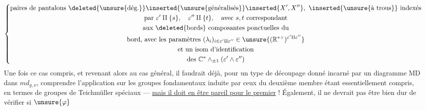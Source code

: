 \[
\left\{\begin{gathered}
\text{paires de pantalons }\deleted{\text{\unsure{dég.}}}\inserted{\text{\unsure{généralisés}}}\inserted{X',X''},\ \inserted{\text{\unsure{à trous}}}\ \text{indexés}\\
\text{par }\varepsilon'\amalg\{s\},\quad\varepsilon''\amalg\{t\},\quad\text{avec }s,t\ \text{correspondant}\\
\text{aux }\deleted{\text{bords}}\ \text{composantes ponctuelles du}\\
\text{bord, avec les paramètres }(\lambda_i)_{i\in\varepsilon'\amalg\varepsilon''}\in\unsure{(\mathbb R^{*+})^{\varepsilon'\amalg\varepsilon''}}\\
\text{et un isom d'identification}\\
\text{des }\mathbb C^*\wedge_{\pm1}(\varepsilon'\wedge\varepsilon'')
\end{gathered}\right.
\]
Une fois ce cas compris, et revenant
alors au cas général, il faudrait déjà,
pour un type de découpage donné
incarné par un diagramme MD
dans $md_{g,\nu}$, comprendre l'application
sur les groupes fondamentaux
induite par
ceux du deuxième membre étant
essentiellement compris, en termes de
groupes de Teichmüller spéciaux
--- \uline{mais il doit en être pareil pour le
premier} ! Également, il ne devrait
pas être bien dur de vérifier si $\unsure{\varphi}$
